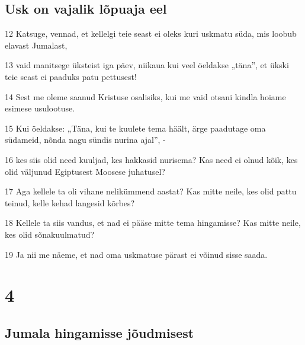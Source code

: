 \section*{Usk on vajalik lõpuaja eel}

\par 12 Katsuge, vennad, et kellelgi teie seast ei oleks kuri uskmatu süda, mis loobub elavast Jumalast,
\par 13 vaid manitsege üksteist iga päev, niikaua kui veel öeldakse „täna”, et ükski teie seast ei paaduks patu pettusest!
\par 14 Sest me oleme saanud Kristuse osalisiks, kui me vaid otsani kindla hoiame esimese usulootuse.
\par 15 Kui öeldakse: „Täna, kui te kuulete tema häält, ärge paadutage oma südameid, nõnda nagu sündis nurina ajal”, -
\par 16 kes siis olid need kuuljad, kes hakkasid nurisema? Kas need ei olnud kõik, kes olid väljunud Egiptusest Moosese juhatusel?
\par 17 Aga kellele ta oli vihane nelikümmend aastat? Kas mitte neile, kes olid pattu teinud, kelle kehad langesid kõrbes?
\par 18 Kellele ta siis vandus, et nad ei pääse mitte tema hingamisse? Kas mitte neile, kes olid sõnakuulmatud?
\par 19 Ja nii me näeme, et nad oma uskmatuse pärast ei võinud sisse saada.


\chapter{4}

\section*{Jumala hingamisse jõudmisest}

